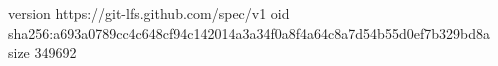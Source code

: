 version https://git-lfs.github.com/spec/v1
oid sha256:a693a0789cc4c648cf94c142014a3a34f0a8f4a64c8a7d54b55d0ef7b329bd8a
size 349692
